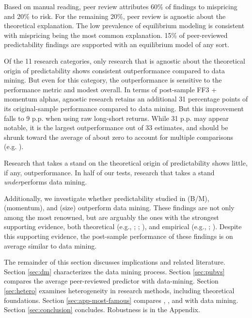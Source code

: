 Based on manual reading, peer review attributes 60\% of findings to mispricing and 20\% to risk. For the remaining 20\%, peer review is agnostic about the theoretical explanation. The low prevalence of equilibrium modeling is consistent with mispricing being the most common explanation. 15\% of peer-reviewed predictability findings are supported with an equilibrium model of any sort. 

Of the 11 research categories, only research that is agnostic about the theoretical origin of predictability shows consistent outperformance compared to data mining. But even for this category, the outperformance is sensitive to the performance metric and modest overall. In terms of post-sample FF3 + momentum alphas, agnostic research retains an additional 31 percentage points of its original-sample performance compared to data mining. But this improvement falls to 9 p.p. when using raw long-short returns. While 31 p.p. may appear notable, it is the largest outperformance out of 33 estimates, and should be shrunk toward the average of about zero to account for multiple comparisons (e.g. \citealt{chen2020publication}).

Research that takes a stand on the theoretical origin of predictability shows little, if any, outperformance. In half of our tests, research that takes a stand \emph{under}performs data mining.

Additionally, we investigate whether predictability studied in \citet{fama1992cross} (B/M), \citet{jegadeesh1993returns} (momentum), and \citet{banz1981relationship} (size) outperform data mining. These findings are not only among the most renowned, but are arguably the ones with the strongest supporting evidence, both theoretical  (e.g., \citealt{gomes2003equilibrium}; \citealt{hong1999unified}; \citealt{berk1995critique}), and empirical (e.g., \citealt{fama1993common}; \citealt{asness2013value}). Despite this supporting evidence, the post-sample performance of these findings is on average similar to data mining.

The remainder of this section discusses implications and related literature. Section \ref{sec:dm} characterizes the data mining process. Section \ref{sec:pubvs} compares the average peer-reviewed predictor with data-mining. Section \ref{sec:hetero} examines heterogeneity in research methods, including theoretical foundations. Section \ref{sec:app-most-famous} compares \citet{fama1992cross}, \citet{jegadeesh1993returns}, and \citet{banz1981relationship} with data mining. Section \ref{sec:conclusion} concludes. Robustness is in the Appendix.

